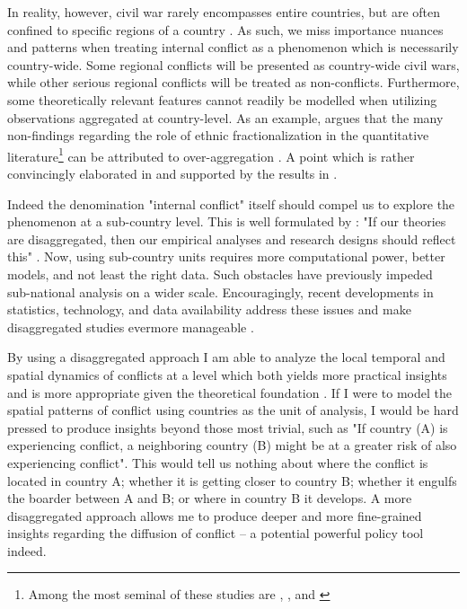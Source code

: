 \documentclass[a4paper]{article}
\begin{document}
In reality, however, civil war rarely encompasses entire countries, but are often confined to specific regions of a country \cite[487]{Cederman_Gleditsch_2009}. As such, we miss importance nuances and patterns when treating internal conflict as a phenomenon which is necessarily country-wide. Some regional conflicts will be presented as country-wide civil wars, while other serious regional conflicts will be treated as non-conflicts. Furthermore, some theoretically relevant features cannot readily be modelled when utilizing observations aggregated at country-level. As an example, \cite{Cederman_Gleditsch_2009} argues that the many non-findings regarding the role of ethnic fractionalization in the quantitative literature\footnote{Among the most seminal of these studies are \cite{Fearon_Laitin_2003}, \cite{Collier_Hoeffler_2004}, and \cite{Hegre_Sambanis_2006}} can be attributed to over-aggregation \citep[493]{Cederman_Gleditsch_2009}. A point which is rather convincingly elaborated in \cite{Cederman_Gleditsch_Buhaug_2013} and supported by the results in \cite{Goldstone_2010}. 

Indeed the denomination "internal conflict" itself should compel us to explore the phenomenon at a sub-country level. This is well formulated by \cite{Cederman_Gleditsch_2009}: "If our theories are disaggregated, then our empirical analyses and research designs should reflect this" \citep[490]{Cederman_Gleditsch_2009}. Now, using sub-country units requires more computational power, better models, and not least the right data. Such obstacles have previously impeded sub-national analysis on a wider scale. Encouragingly, recent developments in statistics, technology, and data availability address these issues and make disaggregated studies evermore manageable \citep[446]{ol2010afghanistan}.\par

By using a disaggregated approach I am able to analyze the local temporal and spatial dynamics of conflicts at a level which both yields more practical insights and is more appropriate given the theoretical foundation \citep[446]{ol2010afghanistan}. If I were to model the spatial patterns of conflict using countries as the unit of analysis, I would be hard pressed to produce insights beyond those most trivial, such as "If country (A) is experiencing conflict, a neighboring country (B) might be at a greater risk of also experiencing conflict". This would tell us nothing about where the conflict is located in country A; whether it is getting closer to country B; whether it engulfs the boarder between A and B; or where in country B it develops. A more disaggregated approach allows me to produce deeper and more fine-grained insights regarding the diffusion of conflict -- a potential powerful policy tool indeed.\par 
\end{document}

